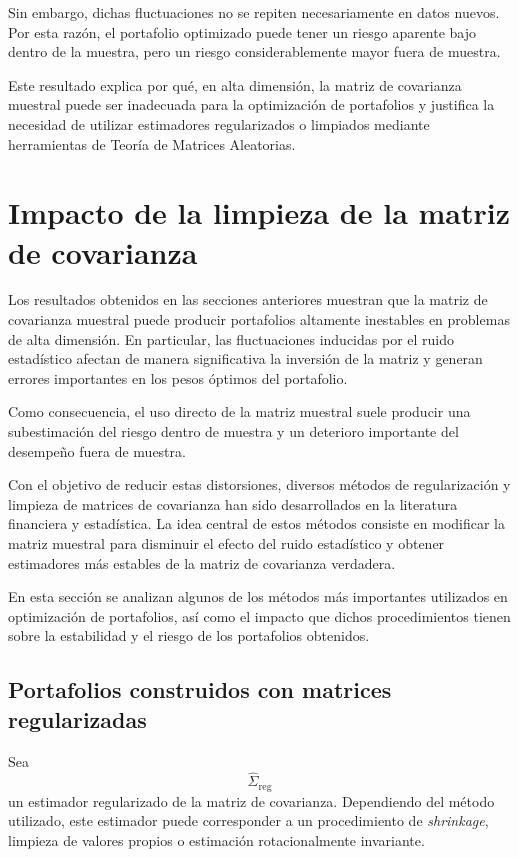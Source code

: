 \documentclass[letterpaper,12pt,oneside]{book}
\begin{document}
Sin embargo, dichas fluctuaciones no se repiten necesariamente en datos nuevos. Por esta razón, el portafolio optimizado puede tener un riesgo aparente bajo dentro de la muestra, pero un riesgo considerablemente mayor fuera de muestra.

Este resultado explica por qué, en alta dimensión, la matriz de covarianza muestral puede ser inadecuada para la optimización de portafolios y justifica la necesidad de utilizar estimadores regularizados o limpiados mediante herramientas de Teoría de Matrices Aleatorias.

\section{Impacto de la limpieza de la matriz de covarianza}

Los resultados obtenidos en las secciones anteriores muestran que la matriz de covarianza muestral puede producir portafolios altamente inestables en problemas de alta dimensión. En particular, las fluctuaciones inducidas por el ruido estadístico afectan de manera significativa la inversión de la matriz y generan errores importantes en los pesos óptimos del portafolio.

Como consecuencia, el uso directo de la matriz muestral suele producir una subestimación del riesgo dentro de muestra y un deterioro importante del desempeño fuera de muestra.

Con el objetivo de reducir estas distorsiones, diversos métodos de regularización y limpieza de matrices de covarianza han sido desarrollados en la literatura financiera y estadística. La idea central de estos métodos consiste en modificar la matriz muestral para disminuir el efecto del ruido estadístico y obtener estimadores más estables de la matriz de covarianza verdadera.

En esta sección se analizan algunos de los métodos más importantes utilizados en optimización de portafolios, así como el impacto que dichos procedimientos tienen sobre la estabilidad y el riesgo de los portafolios obtenidos.

\subsection{Portafolios construidos con matrices regularizadas}

Sea
\[
\widehat{\Sigma}_{\mathrm{reg}}
\]
un estimador regularizado de la matriz de covarianza. Dependiendo del método utilizado, este estimador puede corresponder a un procedimiento de \textit{shrinkage}, limpieza de valores propios o estimación rotacionalmente invariante.
\end{document}
